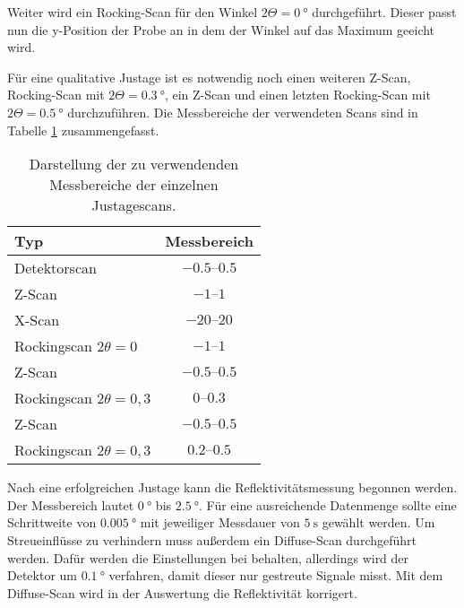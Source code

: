 Weiter wird ein Rocking-Scan für den Winkel $2\Theta = \qty{0}{\degree}$ durchgeführt. Dieser passt nun die y-Position der Probe an in dem der Winkel auf das Maximum geeicht wird. 

Für eine qualitative Justage ist es notwendig noch einen weiteren Z-Scan, Rocking-Scan mit $2\Theta = \qty{0.3}{\degree}$, ein Z-Scan und einen letzten Rocking-Scan mit 
$2\Theta = \qty{0.5}{\degree}$ durchzuführen. Die Messbereiche der verwendeten Scans sind in Tabelle \ref{tab:Messbereiche} zusammengefasst.

\begin{table}
    \centering
    \caption{Darstellung der zu verwendenden Messbereiche der einzelnen Justagescans.}
    \label{tab:Messbereiche}
    \begin{tabular}{l c}
      \toprule
      {Typ} & {Messbereich} \\
      \midrule
      {Detektorscan}                & {$\numrange{-0,5}{0,5}$}  \\
      {Z-Scan}                      & {$\numrange{-1}{1}$}      \\
      {X-Scan}                      & {$\numrange{-20}{20}$}    \\
      {Rockingscan $2\theta=0$}     & {$\numrange{-1}{1}$}      \\
      {Z-Scan}                      & {$\numrange{-0,5}{0,5}$}  \\
      {Rockingscan $2\theta=0,3$}   & {$\numrange{0}{0,3}$}     \\
      {Z-Scan}                      & {$\numrange{-0,5}{0,5}$}  \\
      {Rockingscan $2\theta=0,3$}   & {$\numrange{0,2}{0,5}$}   \\
      \bottomrule
    \end{tabular}
\end{table}

Nach eine erfolgreichen Justage kann die Reflektivitätsmessung begonnen werden. Der Messbereich lautet $\qty{0}{\degree}$ bis $\qty{2.5}{\degree}$. Für eine ausreichende 
Datenmenge sollte eine Schrittweite von $\qty{0.005}{\degree}$ mit jeweiliger Messdauer von $\qty{5}{\second}$ gewählt werden. Um Streueinflüsse zu verhindern muss außerdem ein 
Diffuse-Scan durchgeführt werden. Dafür werden die Einstellungen bei behalten, allerdings wird der Detektor um $\qty{0.1}{\degree}$ verfahren, damit dieser nur gestreute Signale 
misst. Mit dem Diffuse-Scan wird in der Auswertung die Reflektivität korrigert.